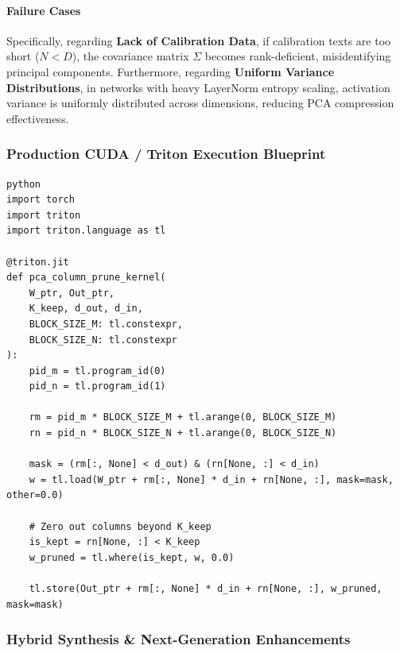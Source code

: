 \paragraph{Failure Cases}

Specifically, regarding \textbf{Lack of Calibration Data}, if calibration texts are too short ($N < D$), the covariance matrix $\Sigma$ becomes rank-deficient, misidentifying principal components. Furthermore, regarding \textbf{Uniform Variance Distributions}, in networks with heavy LayerNorm entropy scaling, activation variance is uniformly distributed across dimensions, reducing PCA compression effectiveness.



\subsubsection*{Production CUDA / Triton Execution Blueprint}

\vspace{0.5em}
\begin{mdframed}[backgroundcolor=codebg, linecolor=codeframe, linewidth=1pt, roundcorner=4pt, innerleftmargin=2pt, innerrightmargin=5pt, innertopmargin=5pt, innerbottommargin=5pt]
\begin{lstlisting}
python
import torch
import triton
import triton.language as tl

@triton.jit
def pca_column_prune_kernel(
    W_ptr, Out_ptr,
    K_keep, d_out, d_in,
    BLOCK_SIZE_M: tl.constexpr,
    BLOCK_SIZE_N: tl.constexpr
):
    pid_m = tl.program_id(0)
    pid_n = tl.program_id(1)

    rm = pid_m * BLOCK_SIZE_M + tl.arange(0, BLOCK_SIZE_M)
    rn = pid_n * BLOCK_SIZE_N + tl.arange(0, BLOCK_SIZE_N)

    mask = (rm[:, None] < d_out) & (rn[None, :] < d_in)
    w = tl.load(W_ptr + rm[:, None] * d_in + rn[None, :], mask=mask, other=0.0)

    # Zero out columns beyond K_keep
    is_kept = rn[None, :] < K_keep
    w_pruned = tl.where(is_kept, w, 0.0)

    tl.store(Out_ptr + rm[:, None] * d_in + rn[None, :], w_pruned, mask=mask)
\end{lstlisting}
\end{mdframed}
\vspace{0.5em}


\subsubsection*{Hybrid Synthesis \& Next-Generation Enhancements}

